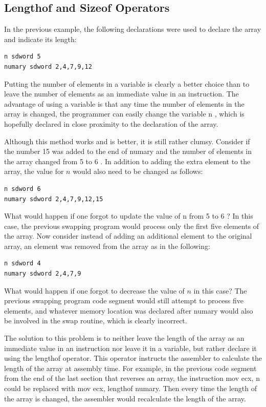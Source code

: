 \documentclass[10pt]{article}
\begin{document}
\subsection*{Lengthof and Sizeof Operators}
In the previous example, the following declarations were used to declare the array and indicate its length:

\begin{verbatim}
n sdword 5
numary sdword 2,4,7,9,12
\end{verbatim}

Putting the number of elements in a variable is clearly a better choice than to leave the number of elements as an immediate value in an instruction. The advantage of using a variable is that any time the number of elements in the array is changed, the programmer can easily change the variable n , which is hopefully declared in close proximity to the declaration of the array.

Although this method works and is better, it is still rather clumsy. Consider if the number 15 was added to the end of numary and the number of elements in the array changed from 5 to 6 . In addition to adding the extra element to the array, the value for $n$ would also need to be changed as follows:

\begin{verbatim}
n sdword 6
numary sdword 2,4,7,9,12,15
\end{verbatim}

What would happen if one forgot to update the value of n from 5 to 6 ? In this case, the previous swapping program would process only the first five elements of the array. Now consider instead of adding an additional element to the original array, an element was removed from the array as in the following:

\begin{verbatim}
n sdword 4
numary sdword 2,4,7,9
\end{verbatim}

What would happen if one forgot to decrease the value of $n$ in this case? The previous swapping program code segment would still attempt to process five elements, and whatever memory location was declared after numary would also be involved in the swap routine, which is clearly incorrect.

The solution to this problem is to neither leave the length of the array as an immediate value in an instruction nor leave it in a variable, but rather declare it using the lengthof operator. This operator instructs the assembler to calculate the length of the array at assembly time. For example, in the previous code segment from the end of the last section that reverses an array, the instruction mov ecx, n could be replaced with mov ecx, lengthof numary. Then every time the length of the array is changed, the assembler would recalculate the length of the array.
\end{document}
